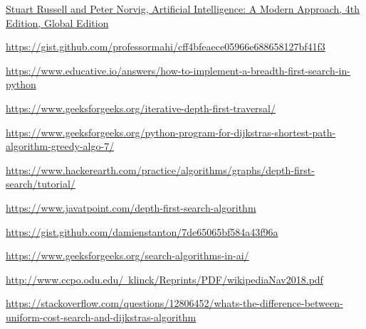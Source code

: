 \documentclass{article}
\begin{document}
\begin{thebibliography}{5}
\href{https://cloud.ducnn.com/s/QKNe9PmcBSdXF3g}{Stuart Russell and Peter Norvig, Artificial Intelligence: A Modern Approach, 4th Edition, Global Edition}

 \href{https://gist.github.com/professormahi/cff4bfeaece05966e688658127bf41f3}{https://gist.github.com/professormahi/cff4bfeaece05966e688658127bf41f3}

 \href{https://www.educative.io/answers/how-to-implement-a-breadth-first-search-in-python}{https://www.educative.io/answers/how-to-implement-a-breadth-first-search-in-python}

 \href{https://www.geeksforgeeks.org/iterative-depth-first-traversal/
}{https://www.geeksforgeeks.org/iterative-depth-first-traversal/
}

 \href{https://www.geeksforgeeks.org/python-program-for-dijkstras-shortest-path-algorithm-greedy-algo-7/
}{https://www.geeksforgeeks.org/python-program-for-dijkstras-shortest-path-algorithm-greedy-algo-7/
}

 \href{https://www.hackerearth.com/practice/algorithms/graphs/depth-first-search/tutorial/
}{https://www.hackerearth.com/practice/algorithms/graphs/depth-first-search/tutorial/
}

 \href{https://www.javatpoint.com/depth-first-search-algorithm
}{https://www.javatpoint.com/depth-first-search-algorithm
}

 \href{https://gist.github.com/damienstanton/7de65065bf584a43f96a
}{https://gist.github.com/damienstanton/7de65065bf584a43f96a
}

\href{https://www.geeksforgeeks.org/search-algorithms-in-ai/
}{https://www.geeksforgeeks.org/search-algorithms-in-ai/
}

\href{http://www.ccpo.odu.edu/~klinck/Reprints/PDF/wikipediaNav2018.pdf
}{http://www.ccpo.odu.edu/~klinck/Reprints/PDF/wikipediaNav2018.pdf
}

\href{https://stackoverflow.com/questions/12806452/whats-the-difference-between-uniform-cost-search-and-dijkstras-algorithm
}{https://stackoverflow.com/questions/12806452/whats-the-difference-between-uniform-cost-search-and-dijkstras-algorithm
}

\end{thebibliography}
\end{document}
